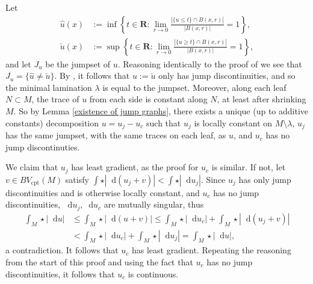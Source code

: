 \documentclass[reqno,10pt]{amsart}
\newcommand{\RR}{\mathbf{R}}
\newcommand*\dif{\mathop{}\!\mathrm{d}}
\newcommand{\cpt}{\mathrm{cpt}}
\theoremstyle{definition}
\numberwithin{equation}{section}
\begin{document}
Let
\begin{align*}
\hat u(x) &:= \inf\left\{t \in \RR: \lim_{r \to 0} \frac{|\{u \leq t\} \cap B(x, r)|}{|B(x, r)|} = 1\right\},\\
\check u(x) &:= \sup\left\{t \in \RR: \lim_{r \to 0} \frac{|\{u \geq t\} \cap B(x, r)|}{|B(x, r)|} = 1\right\},
\end{align*}
and let $J_u$ be the jumpset of $u$.
Reasoning identically to the proof of \cite[Proposition 3.9]{górny2017planar} we see that $J_u = \{\hat u \neq \check u\}$.
By \cite[Theorem 4.1]{HakkarainenKorteLahtiShanmugalingam+2015}, it follows that $u := \check u$ only has jump discontinuities, and so the minimal lamination $\lambda$ is equal to the jumpset.
Moreover, along each leaf $N \subset M$, the trace of $u$ from each side is constant along $N$, at least after shrinking $M$.
So by Lemma \ref{existence of jump graphs}, there exists a unique (up to additive constants) decomposition $u = u_j - u_c$ such that $u_j$ is locally constant on $M \setminus \lambda$, $u_j$ has the same jumpset, with the same traces on each leaf, as $u$, and $u_c$ has no jump discontinuties.

We claim that $u_j$ has least gradient, as the proof for $u_c$ is similar.
If not, let $v \in BV_\cpt(M)$ satisfy $\int \star|\dif(u_j+v)| < \int \star|\dif u_j|$.
Since $u_j$ has only jump discontinuities and is otherwise locally constant, and $u_c$ has no jump discontinuities, $\dif u_j,\dif u_c$ are mutually singular, thus
\begin{align*}
\int_M \star |\dif u| &\leq \int_M \star |\dif(u+v)| \leq \int_M \star|\dif u_c| + \int_M \star|\dif(u_j + v)| \\
&< \int_M \star |\dif u_c| + \int_M \star |\dif u_j| = \int_M \star |\dif u|,
\end{align*}
a contradiction.
It follows that $u_c$ has least gradient.
Repeating the reasoning from the start of this proof and using the fact that $u_c$ has no jump discontinuities, it follows that $u_c$ is continuous.



\printbibliography
\end{document}
